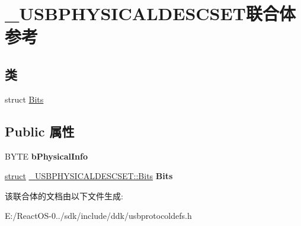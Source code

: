 \hypertarget{union___u_s_b_p_h_y_s_i_c_a_l_d_e_s_c_s_e_t}{}\section{\+\_\+\+U\+S\+B\+P\+H\+Y\+S\+I\+C\+A\+L\+D\+E\+S\+C\+S\+E\+T联合体 参考}
\label{union___u_s_b_p_h_y_s_i_c_a_l_d_e_s_c_s_e_t}
\subsection*{类}
\begin{DoxyCompactItemize}
\item 
struct \hyperlink{struct___u_s_b_p_h_y_s_i_c_a_l_d_e_s_c_s_e_t_1_1_bits}{Bits}
\end{DoxyCompactItemize}
\subsection*{Public 属性}
\begin{DoxyCompactItemize}
\item 
\mbox{\label{union___u_s_b_p_h_y_s_i_c_a_l_d_e_s_c_s_e_t_a02676de70bb57d6ba74da05e93ac920d}} 
B\+Y\+TE {\bfseries b\+Physical\+Info}
\item 
\mbox{\label{union___u_s_b_p_h_y_s_i_c_a_l_d_e_s_c_s_e_t_a513ba49c34cb228449dc7680d4140adb}} 
\hyperlink{interfacestruct}{struct} \hyperlink{struct___u_s_b_p_h_y_s_i_c_a_l_d_e_s_c_s_e_t_1_1_bits}{\+\_\+\+U\+S\+B\+P\+H\+Y\+S\+I\+C\+A\+L\+D\+E\+S\+C\+S\+E\+T\+::\+Bits} {\bfseries Bits}
\end{DoxyCompactItemize}


该联合体的文档由以下文件生成\+:\begin{DoxyCompactItemize}
\item 
E\+:/\+React\+O\+S-\/0../sdk/include/ddk/usbprotocoldefs.\+h\end{DoxyCompactItemize}
